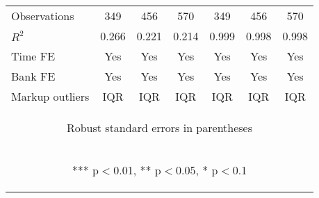 \documentclass[]{article}
\begin{document}
\begin{center}
\begin{tabular}{lcccccc}
Observations & 349 & 456 & 570 & 349 & 456 & 570 \\
$R^2$ & 0.266 & 0.221 & 0.214 & 0.999 & 0.998 & 0.998 \\
Time FE & Yes & Yes & Yes & Yes & Yes & Yes \\
Bank FE & Yes & Yes & Yes & Yes & Yes & Yes \\
 Markup outliers & IQR & IQR & IQR & IQR & IQR & IQR \\ \hline
\multicolumn{7}{c}{\begin{footnotesize} Robust standard errors in parentheses\end{footnotesize}} \\
\multicolumn{7}{c}{\begin{footnotesize} *** p$<$0.01, ** p$<$0.05, * p$<$0.1\end{footnotesize}} \\
\end{tabular}
\end{center}
\end{document}

